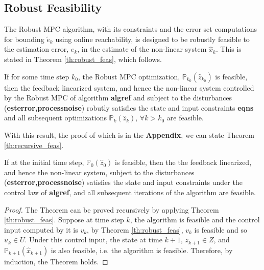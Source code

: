 \subsection{Robust Feasibility}

The Robust MPC algorithm, with its constraints and the error set computations for bounding $\tilde{e}_k$ using online reachability, is designed to be robustly feasible to the estimation error, $e_k$, in the estimate of the non-linear system $\hat{x}_k$. This is stated in Theorem \ref{th:robust_feas}, which follows.

\begin{theorem}
\label{th:robust_feas}
If for some time step $k_0$, the Robust MPC optimization, $\mathbb{P}_{k_0}(\hat{z}_{k_0})$ is feasible, then the feedback linearized system, and hence the non-linear system controlled by the Robust MPC of algorithm \textbf{algref} and subject to the disturbances (\textbf{esterror,processnoise}) robutly satisfies the state and input constraints \textbf{eqns} and all subsequent optimizations $\mathbb{P}_{k}(\hat{z}_{k}), \, \forall k>k_0$ are feasible.
\end{theorem}

With this result, the proof of which is in the \textbf{Appendix}, we can state Theorem \ref{th:recursive_feas}.

\begin{theorem}
\label{th:recursive_feas}
If at the initial time step, $\mathbb{P}_0(\hat{z}_0)$ is feasible, then the the feedback linearized, and hence the non-linear system, subject to the disturbances  (\textbf{esterror,processnoise}) satisfies the state and input constraints under the control law of \textbf{algref}, and all subsequent iterations of the algorithm are feasible.
\end{theorem}

\begin{proof}
The Theorem can be proved recursively by applying Theorem \ref{th:robust_feas}. Suppose at time step $k$, the algorithm is feasible and the control input computed by it is $v_k$, by Theorem \ref{th:robust_feas}, $v_k$ is feasible and so $u_k \in U$. Under this control input, the state at time $k+1$, $z_{k+1} \in Z$, and $\mathbb{P}_{k+1}(\hat{x}_{k+1})$ is also feasible, i.e. the algorithm is feasible. Therefore, by induction, the Theorem holds. 
\end{proof}